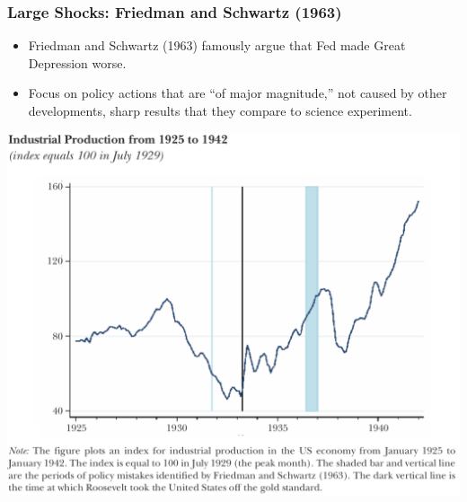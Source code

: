 \documentclass[english,xcolor=svgnames]{beamer}
\begin{document}
\begin{frame}
\frametitle{Large Shocks: Friedman and Schwartz (1963)}
\begin{itemize}
	\item Friedman and Schwartz (1963) famously argue that Fed made Great Depression worse.
	\item Focus on policy actions that are ``of major magnitude,'' not caused by other developments, sharp results that they compare to science experiment.
\end{itemize}
\centering
\includegraphics[scale=0.4]{../../Images/NS2018fs.png}	

\end{frame}
\end{document}
